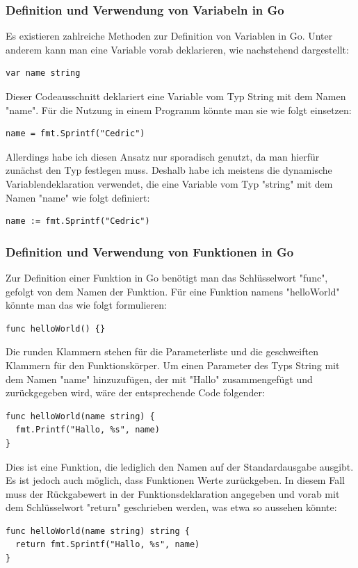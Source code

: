 \subsubsection{Definition und Verwendung von Variabeln in Go}
Es existieren zahlreiche Methoden zur Definition von Variablen in Go. Unter anderem kann man eine Variable vorab deklarieren, wie nachstehend dargestellt:
\begin{lstlisting}
var name string
\end{lstlisting}
Dieser Codeausschnitt deklariert eine Variable vom Typ String mit dem Namen "name". Für die Nutzung in einem Programm könnte man sie wie folgt einsetzen:
\begin{lstlisting}
name = fmt.Sprintf("Cedric")
\end{lstlisting}
Allerdings habe ich diesen Ansatz nur sporadisch genutzt, da man hierfür zunächst den Typ festlegen muss. Deshalb habe ich meistens die dynamische Variablendeklaration verwendet, die eine Variable vom Typ "string" mit dem Namen "name" wie folgt definiert:
\begin{lstlisting}
name := fmt.Sprintf("Cedric")
\end{lstlisting}
\subsubsection{Definition und Verwendung von Funktionen in Go}
Zur Definition einer Funktion in Go benötigt man das Schlüsselwort "func", gefolgt von dem Namen der Funktion. Für eine Funktion namens "helloWorld" könnte man das wie folgt formulieren:
\begin{lstlisting}
func helloWorld() {}
\end{lstlisting}
Die runden Klammern stehen für die Parameterliste und die geschweiften Klammern für den Funktionskörper. Um einen Parameter des Typs String mit dem Namen "name" hinzuzufügen, der mit "Hallo" zusammengefügt und zurückgegeben wird, wäre der entsprechende Code folgender:
\begin{lstlisting}
func helloWorld(name string) {
  fmt.Printf("Hallo, %s", name)
}
\end{lstlisting}
Dies ist eine Funktion, die lediglich den Namen auf der Standardausgabe ausgibt. Es ist jedoch auch möglich, dass Funktionen Werte zurückgeben. In diesem Fall muss der Rückgabewert in der Funktionsdeklaration angegeben und vorab mit dem Schlüsselwort "return" geschrieben werden, was etwa so aussehen könnte:
\begin{lstlisting}
func helloWorld(name string) string {
  return fmt.Sprintf("Hallo, %s", name)
}
\end{lstlisting}
